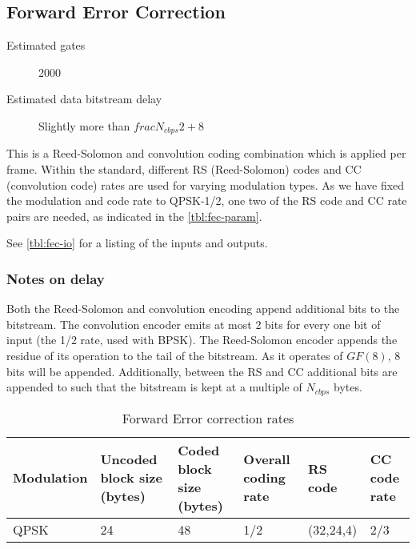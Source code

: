 
\subsection{Forward Error Correction}

\label{sec:fec}
\begin{description}
	\item[Estimated gates] 2000
	\item[Estimated data bitstream delay] Slightly more than $frac{N_{cbps}}{2} + 8$
\end{description}

This is a Reed-Solomon and convolution coding combination
which is applied per frame. Within the standard, different
RS (Reed-Solomon) codes and CC (convolution code) rates are
used for varying modulation types. As we have fixed the
modulation and code rate to QPSK-1/2, one two of the RS
code and CC rate pairs are needed, as indicated in the
\autoref{tbl:fec-param}.

See \autoref{tbl:fec-io} for a listing of the inputs and outputs.

\subsubsection{Notes on delay}

Both the Reed-Solomon and convolution encoding append additional bits to the bitstream. The convolution encoder emits at most 2 bits for every one bit of input (the 1/2 rate, used with BPSK). The Reed-Solomon encoder appends the residue of its operation to the tail of the bitstream. As it operates of $GF(8)$, 8 bits will be appended. Additionally, between the RS and CC additional bits are appended to such that the bitstream is kept at a multiple of $N_{cbps}$ bytes.

\begin{table*}
	\begin{tabularx}{\linewidth}{X|X|X|X|X|X}
	\label{tbl:fec-param}
		Modulation & Uncoded block size (bytes) &
		Coded block size (bytes) & Overall coding
		rate & RS code & CC code rate \\ \hline
		QPSK & 24 & 48 & 1/2 & (32,24,4) & 2/3 \\
	\end{tabularx}
	\caption{Forward Error correction rates}
\end{table*}

